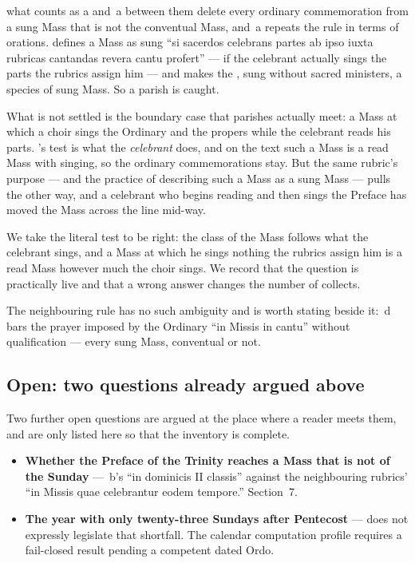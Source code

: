 \begin{contested}{what counts as a }
 and \,a between them delete every ordinary commemoration from
a sung Mass that is not the conventual Mass, and \,a repeats the rule
in terms of orations.  defines a Mass as sung ``si sacerdos celebrans
partes ab ipso iuxta rubricas cantandas revera cantu profert'' --- if the
celebrant actually sings the parts the rubrics assign him --- and makes the
, sung without sacred ministers, a species of sung Mass.
So a parish  is caught.

What is not settled is the boundary case that parishes actually meet: a Mass
at which a choir sings the Ordinary and the propers while the celebrant reads
his parts. 's test is what the \emph{celebrant} does, and on the
text such a Mass is a read Mass with singing, so the ordinary commemorations
stay. But the same rubric's purpose --- and the practice of describing such a
Mass as a sung Mass --- pulls the other way, and a celebrant who begins reading
and then sings the Preface has moved the Mass across the line mid-way.

We take the literal test to be right: the class of the Mass follows what the
celebrant sings, and a Mass at which he sings nothing the rubrics assign him is
a read Mass however much the choir sings. We record that the question is
practically live and that a wrong answer changes the number of collects.

The neighbouring rule has no such ambiguity and is worth stating beside it:
\,d bars the prayer imposed by the Ordinary ``in Missis in cantu''
without qualification --- every sung Mass, conventual or not.
\end{contested}

\subsection{Open: two questions already argued above}

Two further open questions are argued at the place where a reader meets them,
and are only listed here so that the inventory is complete.

\begin{itemize}
\item \textbf{Whether the Preface of the Trinity reaches a Mass that is not of
the Sunday} --- \,b's ``in dominicis II classis'' against the
neighbouring rubrics' ``in Missis quae celebrantur eodem tempore.'' Section~7.

\item \textbf{The year with only twenty-three Sundays after Pentecost} ---
 does not expressly legislate that shortfall. The calendar computation
profile requires a fail-closed result pending a competent dated Ordo.
\end{itemize}

